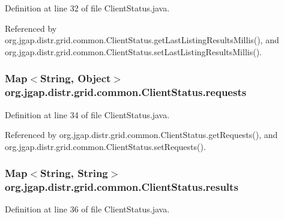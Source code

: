 Definition at line 32 of file Client\-Status.\-java.



Referenced by org.\-jgap.\-distr.\-grid.\-common.\-Client\-Status.\-get\-Last\-Listing\-Results\-Millis(), and org.\-jgap.\-distr.\-grid.\-common.\-Client\-Status.\-set\-Last\-Listing\-Results\-Millis().

\hypertarget{classorg_1_1jgap_1_1distr_1_1grid_1_1common_1_1_client_status_a0afa5f4c9a0b5a684fb486e67858306b}{
\subsubsection[{requests}]{\setlength{\rightskip}{0pt plus 5cm}Map$<$String, Object$>$ org.\-jgap.\-distr.\-grid.\-common.\-Client\-Status.\-requests\hspace{0.3cm}{\ttfamily [private]}}}\label{classorg_1_1jgap_1_1distr_1_1grid_1_1common_1_1_client_status_a0afa5f4c9a0b5a684fb486e67858306b}


Definition at line 34 of file Client\-Status.\-java.



Referenced by org.\-jgap.\-distr.\-grid.\-common.\-Client\-Status.\-get\-Requests(), and org.\-jgap.\-distr.\-grid.\-common.\-Client\-Status.\-set\-Requests().

\hypertarget{classorg_1_1jgap_1_1distr_1_1grid_1_1common_1_1_client_status_a2ca3e7f0916d416de51230724aaae46d}{
\subsubsection[{results}]{\setlength{\rightskip}{0pt plus 5cm}Map$<$String, String$>$ org.\-jgap.\-distr.\-grid.\-common.\-Client\-Status.\-results\hspace{0.3cm}{\ttfamily [private]}}}\label{classorg_1_1jgap_1_1distr_1_1grid_1_1common_1_1_client_status_a2ca3e7f0916d416de51230724aaae46d}


Definition at line 36 of file Client\-Status.\-java.



